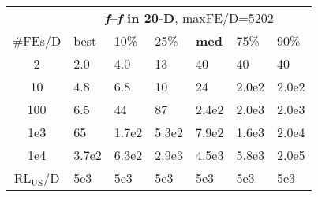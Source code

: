 \begin{tabular}{c|llllll}
 & \multicolumn{6}{|c}{\textbf{\textit{f}\raisebox{-0.35ex}{1}--\textit{f}\raisebox{-0.35ex}{24} in 20-D}, maxFE/D=5202}\\
\#FEs/D & best & 10\% & 25\% & \textbf{med} & 75\% & 90\%\\
2 & \hspace*{1ex}2.0 & \hspace*{1ex}4.0 & 13 & 40 & 40 & 40\\
10 & \hspace*{1ex}4.8 & \hspace*{1ex}6.8 & 10 & 24 & 2.0e2 & 2.0e2\\
100 & \hspace*{1ex}6.5 & 44 & 87 & 2.4e2 & 2.0e3 & 2.0e3\\
1e3 & 65 & 1.7e2 & 5.3e2 & 7.9e2 & 1.6e3 & 2.0e4\\
1e4 & 3.7e2 & 6.3e2 & 2.9e3 & 4.5e3 & 5.8e3 & 2.0e5\\
$\text{RL}_{\text{US}}$/D & 5e3 & 5e3 & 5e3 & 5e3 & 5e3 & 5e3
\end{tabular}
